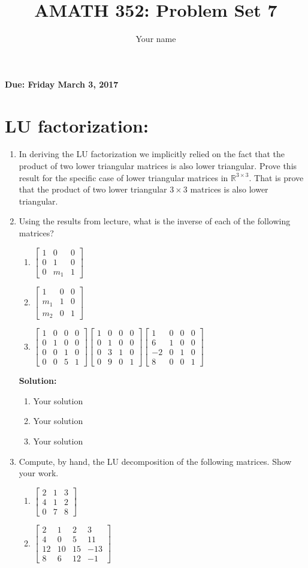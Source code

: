 \documentclass[]{article}
\title{AMATH 352: Problem Set 7}
\author{Your name}
\newcommand{\R}{\mathbb{R}}				%
\newcommand{\bbm}{\begin{bmatrix}}		%
\newcommand{\ebm}{\end{bmatrix}}		%
\newcommand{\solution}{\vskip 0.5cm \textbf{\large Solution:} \\}
\begin{document}
\maketitle
{\Large \textbf{Due: Friday March 3, 2017}} \\

\section*{LU factorization:}
\begin{enumerate}
	\item In deriving the LU factorization we implicitly relied on the fact that the product of two lower triangular matrices is also lower triangular. Prove this result for the specific case of lower triangular matrices in $\R^{3\times3}$. That is prove that the product of two lower triangular $3\times3$ matrices is also lower triangular.
	\item Using the results from lecture, what is the inverse of each of the following matrices?
	\begin{enumerate}
		\item $\bbm 1&0&0\\0&1&0\\0&m_1&1 \ebm$
		\item $\bbm 1&0&0\\m_1&1&0\\m_2&0&1 \ebm$
		\item $\bbm 1&0&0&0\\0&1&0&0\\0&0&1&0\\0&0&5&1 \ebm \bbm 1&0&0&0\\0&1&0&0\\0&3&1&0\\0&9&0&1 \ebm \bbm 1&0&0&0\\6&1&0&0\\-2&0&1&0\\8&0&0&1\ebm $
	\end{enumerate}

	\solution
	\begin{enumerate}
		\item Your solution
		\item Your solution
		\item Your solution
	\end{enumerate}


	\item Compute, by hand, the LU decomposition of the following matrices. Show your work.
	\begin{enumerate}
		\item $\bbm 2&1&3\\4&1&2\\0&7&8 \ebm $
		\item $\bbm 2&1&2&3\\4&0&5&11\\12&10&15&-13\\8&6&12&-1 \ebm $
	\end{enumerate}


\end{enumerate}
\end{document}
